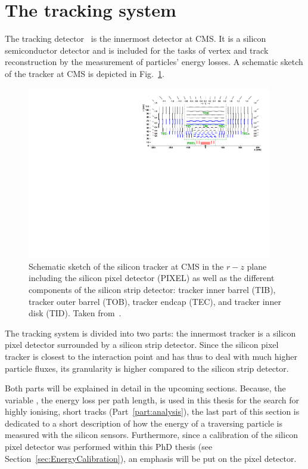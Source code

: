 \section{The tracking system}
\label{sec:TrackingSystem}
The tracking detector~\cite{bib:CMS:TDR_2006,bib:CMS:Tracker_1997,bib:CMS:Tracker_2000} is the innermost detector at CMS. 
It is a silicon semiconductor detector and is included for the tasks of vertex and track reconstruction by the measurement of particles' energy losses.
A schematic sketch of the tracker at CMS is depicted in Fig.~\ref{fig:Tracker}.
\begin{figure}[!b]
  \centering
      \includegraphics[width=0.95\textwidth]{figures/experiment/CMS/TrackerLayoutNew.pdf}
  \caption{Schematic sketch of the silicon tracker at CMS in the $r - z$ plane including the silicon pixel detector (PIXEL) as well as the different components of the silicon strip detector: tracker inner barrel (TIB), tracker outer barrel (TOB), tracker endcap (TEC), and tracker inner disk (TID). Taken from~\cite{bib:CMS:tracking_8TeV}.
           }  
  \label{fig:Tracker}
\end{figure}
The tracking system is divided into two parts: the innermost tracker is a silicon pixel detector surrounded by a silicon strip detector.
Since the silicon pixel tracker is closest to the interaction point and has thus to deal with much higher particle fluxes, its granularity is higher compared to the silicon strip detector.

Both parts will be explained in detail in the upcoming sections.
Because, the variable \dedx, the energy loss per path length, is used in this thesis for the search for highly ionising, short tracks (Part~\ref{part:analysis}), the last part of this section is dedicated to a short description of how the energy of a traversing particle is measured with the silicon sensors.
Furthermore, since a calibration of the silicon pixel detector was performed within this PhD thesis (see Section~\ref{sec:EnergyCalibration}), an emphasis will be put on the pixel detector.

